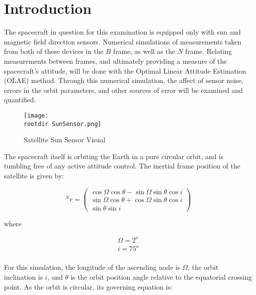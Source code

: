 \documentclass[]{aiaa-tc}%
\newcommand{\parens} [1] {\left(  #1  \right)}
\newcommand{\rootdir}{./Figures/}
\newcommand{\arrayp}[2]{\parens{ \begin{array}{#1}  #2 \end{array} } }
\begin{document}
\section{Introduction}

The spacecraft in question for this examination is equipped only with sun and magnetic field direction sensors. Numerical simulations of measurements taken from both of these devices in the $B$ frame, as well as the $N$ frame. Relating measurements between frames, and ultimately providing a measure of the spacecraft's attitude, will be done with the Optimal Linear Attitude Estimation (OLAE) method. Through this numerical simulation, the affect of sensor noise, errors in the orbit parameters, and other sources of error will be examined and quantified. 

\begin{centering}
	\begin{figure}[Hh]
	\hspace{2.5cm}
		\texttt{[image: \\rootdir SunSensor.png]}
		\caption{Satellite Sun Sensor Visual}
		\label{fig: Satellite Sun Sensor}
	\end{figure}
\end{centering}


The spacecraft itself is orbiting the Earth in a pure circular orbit, and is tumbling free of any active attitude control. The inertial frame position of the satellite is given by:

\begin{equation}
	^Nr = \arrayp{c}{     \cos{\Omega} \cos{\theta} - \sin{\Omega} \sin{\theta} \cos{i} 	\\
				      \sin{\Omega} \cos{\theta} + \cos{\Omega} \sin{\theta} \cos{i} \\
									\sin{\theta}\sin{i}}
	\label{eq:Inertial Orbit Position Equations}
\end{equation}  

where 

\begin{displaymath}
	\begin{array}{c}
		\Omega=2^o \\
		i = 75^o	\\
	\end{array}
\end{displaymath}

For this simulation, the longitude of the ascending node is $\Omega$, the orbit inclination is $i$, and $\theta$ is the orbit position angle relative to the equatorial crossing point. As the orbit is circular, its governing equation is:
\end{document}
